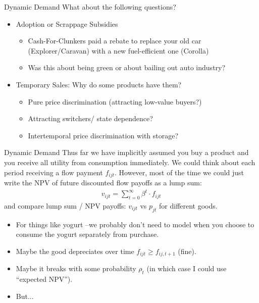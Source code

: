 \begin{frame}{Dynamic Demand}
What about the following questions?
\begin{itemize}
\item Adoption or Scrappage Subsidies
\begin{itemize}
\item Cash-For-Clunkers paid a rebate to replace your old car (Explorer/Caravan) with a new fuel-efficient one (Corolla)
\item Was this about being green or about bailing out auto industry?
\end{itemize}
\item Temporary Sales: Why do some products have them?
\begin{itemize}
\item Pure price discrimination (attracting low-value buyers?) 
\item Attracting switchers/ state dependence?
\item Intertemporal price discrimination with storage?
\end{itemize}
\end{itemize}
\end{frame}



\begin{frame}{Dynamic Demand}
Thus far we have implicitly assumed you buy a product and you receive all utility from consumption immediately. We could think about each period receiving a \alert{flow payment} $f_{ijt}$. However, most of the time we could just write the NPV of future discounted flow payoffs as a \alert{lump sum}:
\begin{align*}
v_{ijt} = \sum_{t=0}^{\infty} \beta^t \cdot f_{ijt}
\end{align*}
and compare lump sum / NPV payoffs: $v_{ijt}$ vs $p_{jt}$ for different goods.
\begin{itemize}
\item For things like yogurt --we probably don't need to model when you choose to consume the yogurt separately from purchase.
\item Maybe the good depreciates over time $f_{ijt} \geq f_{ij,t+1}$ (fine).
\item Maybe it breaks with some probability $\rho_t$ (in which case I could use ``expected NPV'').
\item But...
\end{itemize}
\end{frame}



